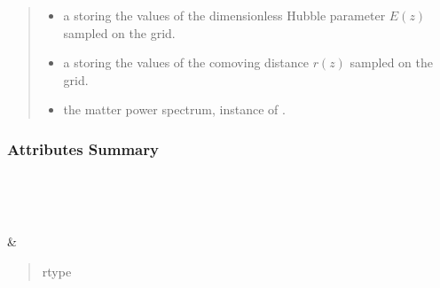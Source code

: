 \documentclass[letterpaper,10pt,english]{sphinxmanual}
\begin{document}
\begin{fulllineitems}
\begin{quote}
\begin{description}
\begin{itemize}
\item {} 
\sphinxAtStartPar
{} \textendash{} a  storing the values of the dimensionless Hubble parameter
\(E(z)\) sampled on the grid.

\item {} 
\sphinxAtStartPar
{} \textendash{} a  storing the values of the comoving distance
\(r(z)\) sampled on the grid.

\item {} 
\sphinxAtStartPar
{} \textendash{} the matter power spectrum, instance of .

\end{itemize}

\end{description}\end{quote}
\subsubsection*{Attributes Summary}


\begin{savenotes}\sphinxatlongtablestart\begin{longtable}[c]{}
\hline

\endfirsthead

%
{}\\
\hline

\endhead

\hline
{}\\
\endfoot

\endlastfoot

\sphinxAtStartPar
{\hyperref[\detokenize{api/seyfert.cosmology.cosmology.Cosmology:seyfert.cosmology.cosmology.Cosmology.E_z}]{}}
&
\sphinxAtStartPar
\begin{quote}\begin{description}
\item[{rtype}] \leavevmode
\sphinxAtStartPar
{}

\end{description}\end{quote}


\end{longtable}
\end{savenotes}
\end{fulllineitems}
\end{document}
